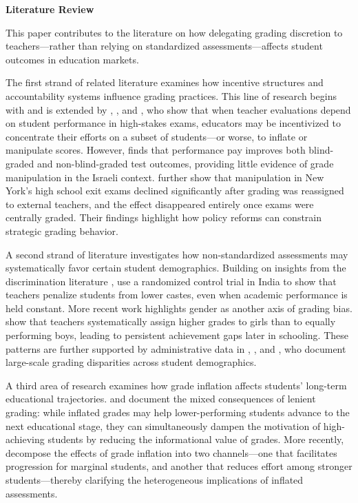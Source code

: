 
\vspace{1em}

\noindent
\textbf{Literature Review}

This paper contributes to the literature on how delegating grading discretion to teachers—rather than relying on standardized assessments—affects student outcomes in education markets.

The first strand of related literature examines how incentive structures and accountability systems influence grading practices. This line of research begins with \citet{hanushek1986} and is extended by \citet{jacob2003}, \citet{figlio2006}, and \citet{neal2008}, who show that when teacher evaluations depend on student performance in high-stakes exams, educators may be incentivized to concentrate their efforts on a subset of students—or worse, to inflate or manipulate scores. However, \citet{lavy2009} finds that performance pay improves both blind-graded and non-blind-graded test outcomes, providing little evidence of grade manipulation in the Israeli context. \citet{dee2019} further show that manipulation in New York’s high school exit exams declined significantly after grading was reassigned to external teachers, and the effect disappeared entirely once exams were centrally graded. Their findings highlight how policy reforms can constrain strategic grading behavior.

A second strand of literature investigates how non-standardized assessments may systematically favor certain student demographics. Building on insights from the discrimination literature \citep{becker1971,bertrand2004}, \citet{hanna2012} use a randomized control trial in India to show that teachers penalize students from lower castes, even when academic performance is held constant. More recent work highlights gender as another axis of grading bias. \citet{lavy2018} show that teachers systematically assign higher grades to girls than to equally performing boys, leading to persistent achievement gaps later in schooling. These patterns are further supported by administrative data in \citet{burgess2013}, \citet{cornwell2013}, and \citet{ferman2022}, who document large-scale grading disparities across student demographics.

A third area of research examines how grade inflation affects students’ long-term educational trajectories. \citet{betts2003} and \citet{figlio2004} document the mixed consequences of lenient grading: while inflated grades may help lower-performing students advance to the next educational stage, they can simultaneously dampen the motivation of high-achieving students by reducing the informational value of grades. More recently, \citet{denning2023} decompose the effects of grade inflation into two channels—one that facilitates progression for marginal students, and another that reduces effort among stronger students—thereby clarifying the heterogeneous implications of inflated assessments.

